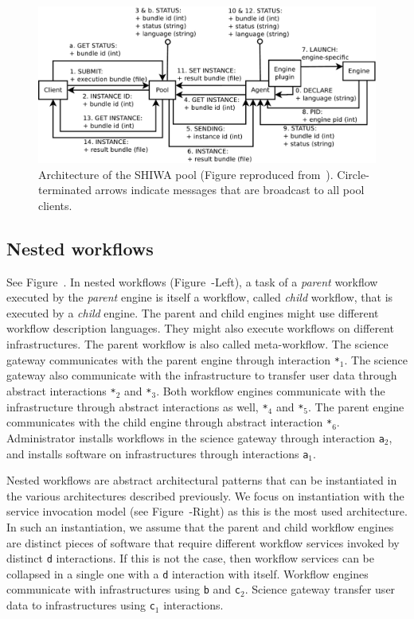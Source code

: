 \documentclass[preprint,3p,twocolumn]{elsarticle}
\begin{document}
\begin{figure}
\centering
\includegraphics[width=1.5\columnwidth]{figures/pool-interactions.pdf}
\caption{Architecture of the SHIWA pool (Figure reproduced
  from~\cite{ROGE-13}). Circle-terminated arrows indicate messages
  that are broadcast to all pool clients.}
\label{fig:shiwa-pool-architecture}
\end{figure}


\subsection{Nested workflows}

See Figure~. In nested workflows
(Figure~-Left), a task of a \emph{parent} workflow
executed by the \emph{parent} engine is itself a workflow, called
\emph{child} workflow, that is executed by a \emph{child} engine. The
parent and child engines might use different workflow description
languages. They might also execute workflows on different
infrastructures. The parent workflow is also called meta-workflow. The
science gateway communicates with the parent engine through
interaction \texttt{*$_1$}. The science gateway also communicate with
the infrastructure to transfer user data through abstract interactions
\texttt{*$_2$} and \texttt{*$_3$}. Both workflow engines communicate
with the infrastructure through abstract interactions as well,
\texttt{*$_4$} and \texttt{*$_5$}. The parent engine communicates with
the child engine through abstract interaction
\texttt{*$_6$}. Administrator installs workflows in the science
gateway through interaction \texttt{a$_2$}, and installs software on
infrastructures through interactions \texttt{a$_1$}.

Nested workflows are abstract architectural patterns that can be
instantiated in the various architectures described previously. We
focus on instantiation with the service invocation model (see
Figure~-Right) as this is the most used
architecture. In such an instantiation, we assume that the parent and
child workflow engines are distinct pieces of software that require
different workflow services invoked by distinct \texttt{d}
interactions. If this is not the case, then workflow services can be
collapsed in a single one with a \texttt{d} interaction with
itself. Workflow engines communicate with infrastructures using
\texttt{b} and \texttt{c$_2$}. Science gateway transfer user data to
infrastructures using \texttt{c$_1$} interactions.
\end{document}
